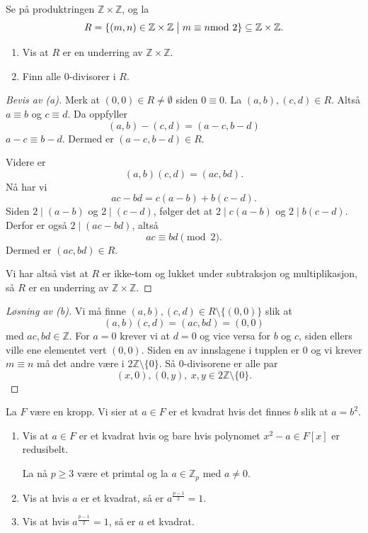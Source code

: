 \documentclass[11pt]{article}
\begin{document}
\newpage 
\begin{prob}[3]
    Se på produktringen $\mathbb Z \times \mathbb Z$, og la 
    \[
        R = \{(m,n) \in \mathbb Z \times \mathbb Z \bigm| 
        m\equiv n \!\!\!\! \mod 2\}
        \subseteq \mathbb Z \times \mathbb Z.
    \]


    \begin{enumerate}[label=(\alph*), align=left]
        \item Vis at $R$ er en underring av $\mathbb Z \times 
            \mathbb Z$. 
        \item Finn alle $0$-divisorer i $R$.
    \end{enumerate}
\end{prob}
\begin{proof}[Bevis av (a)]
    Merk at $(0,0) \in R \neq \emptyset$ siden $0 \equiv 0$.
    La $(a,b),(c,d) \in R$. Altså $a \equiv b$ og $c \equiv d$.
    Da oppfyller 
    \[
        (a,b)-(c,d) = (a-c,b-d) 
    \]
    $a-c \equiv b-d$. 
    Dermed er $(a-c,b-d)\in R$.

    Videre er
    \[
        (a,b)(c,d) = (ac,bd).
    \]
    Nå har vi
    \[
        ac-bd = c(a-b)+b(c-d).
    \]
    Siden $2 \mid (a-b)$ og $2 \mid (c-d)$, følger det at
    $2 \mid c(a-b)$ og $2 \mid b(c-d)$. Derfor er også
    $2 \mid (ac-bd)$, altså
    \[
        ac \equiv bd \pmod 2.
    \]
    Dermed er $(ac,bd)\in R$.

    Vi har altså vist at $R$ er ikke-tom og lukket under subtraksjon
    og multiplikasjon, så $R$ er en underring av $\mathbb Z \times 
    \mathbb Z$.
\end{proof}
\begin{proof}[Løsning av (b)]
    Vi må finne $(a,b),(c,d) \in R\setminus \{(0,0)\}$ slik at 
    \[
        (a,b)(c,d) = (ac,bd) = (0,0)
    \]
    med $ac,bd \in \mathbb Z$. For $a = 0$ krever vi at 
    $d = 0$ og vice versa for $b$ og $c$, siden ellers ville 
    ene elementet vert $(0,0)$. Siden en av innslagene i tupplen 
    er $0$ og vi krever $m \equiv n$ må det andre være 
    i $2\mathbb Z \setminus \{0\}$. Så $0$-divisorene er alle par 
    \[
        (x,0),(0,y), \ x, y \in 2\mathbb Z \setminus \{0\}. 
    \]
\end{proof}
\newpage 
\begin{prob}[4]
    La $F$ være en kropp. Vi sier at $a \in F$ er et kvadrat 
    hvis det finnes $b$ slik at $a = b^2$. 

    \begin{enumerate}[label=(\alph*), align=left]
        \item Vis at $a \in F$ er et kvadrat hvis og bare hvis 
            polynomet $x^2 - a \in F[x]$ er redusibelt.

            \medskip 
            La nå $p \geq 3$ være et primtal og la $a \in \mathbb Z_p$
            med $a \neq 0$.
        \item Vis at hvis $a$ er et kvadrat, så er 
            $a^{\frac{p-1}{2}} = 1$.
        \item Vis at hvis $a^{\frac{p-1}{2}} = 1$, så er 
            $a$ et kvadrat.
    \end{enumerate}
\end{prob}
\end{document}
